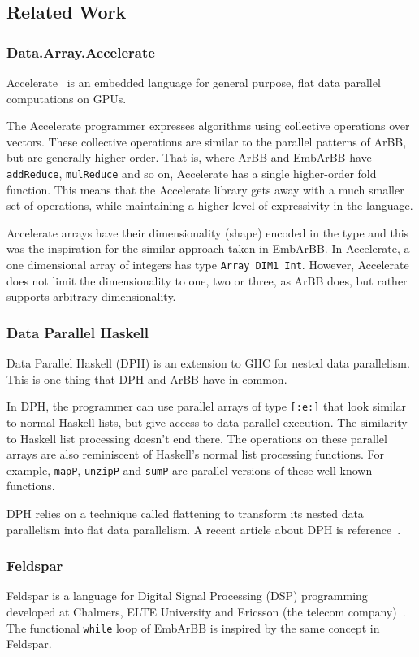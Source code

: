 
\subsection{Related Work} 
\subsubsection{Data.Array.Accelerate} 
Accelerate~\cite{accelerate} is an embedded language for general purpose, 
flat data parallel computations on GPUs. 

The Accelerate programmer expresses algorithms using collective operations 
over vectors. These collective operations are similar to the 
parallel patterns of ArBB, but are generally higher order. That is, where 
ArBB and EmbArBB have {\tt addReduce}, {\tt mulReduce} and so on, Accelerate
has a single higher-order fold function. This means that the Accelerate library
gets away with a much smaller set of operations, while maintaining a higher 
level of expressivity in the language. 

Accelerate arrays have their dimensionality (shape) encoded in the type 
and this was the inspiration for the similar approach taken in EmbArBB. In 
Accelerate, a one dimensional array of integers has type {\tt Array DIM1 Int}.
However, Accelerate does not limit the dimensionality to one, two or three,
as ArBB does, but rather supports arbitrary dimensionality.

\subsubsection{Data Parallel Haskell} 
Data Parallel Haskell (DPH) is an extension to GHC for nested data parallelism. 
This is one thing that DPH and ArBB have in common. 
 
In DPH, the programmer can use parallel arrays of type {\tt [:e:]} that look
similar to normal Haskell lists, but give access to data parallel execution.
The similarity to Haskell list processing doesn't end there. The operations 
on these parallel arrays are also reminiscent of Haskell's normal list processing functions.
For example, {\tt mapP}, {\tt unzipP} and {\tt sumP} are parallel versions of 
these well known functions. 

DPH relies on a technique called flattening to transform its nested data parallelism 
into flat data parallelism. 
A recent article about DPH is reference~\cite{DPH}. 
  
 

\subsubsection{Feldspar} 
Feldspar is a language for Digital Signal Processing (DSP) programming
developed at Chalmers, ELTE University and Ericsson 
(the telecom company)~\cite{FELDSPAR2010}. The functional {\tt while} loop 
of EmbArBB is inspired by the same concept in Feldspar. 

